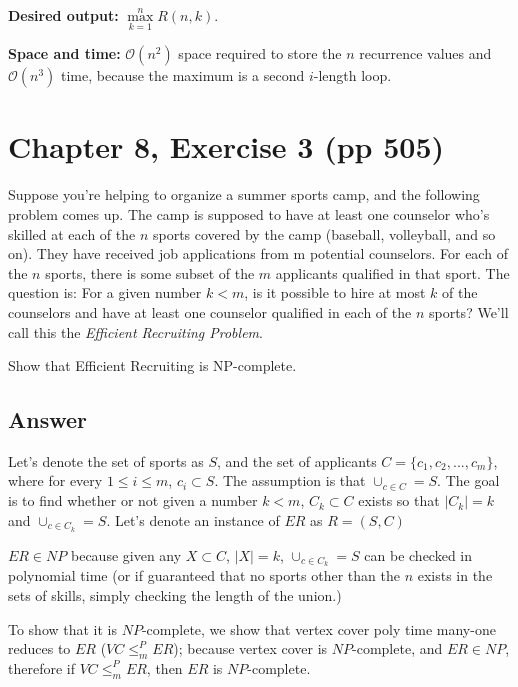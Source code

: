 \documentclass[12pt, letterpaper]{article}
\begin{document}
\vspace{5mm}
\noindent\textbf{Desired output:}
$\max\limits_{k=1}^{n} R(n, k)$.

\vspace{5mm}
\noindent\textbf{Space and time:}
$\mathcal{O}(n^2)$ space required to store the $n$ recurrence values and $\mathcal{O}(n^3)$ time, because the maximum is a second $i$-length loop.


\clearpage

\section{Chapter 8, Exercise 3 (pp 505)}
Suppose you're helping to organize a summer sports camp, and the following problem comes up. 
The camp is supposed to have at least one counselor who's skilled at each of the $n$ sports covered by the camp (baseball, volleyball, and so on). 
They have received job applications from m potential counselors. 
For each of the $n$ sports, there is some subset of the $m$ applicants qualified in that sport. 
The question is: For a given number $k < m$, is it possible to hire at most $k$ of the counselors and have at least one counselor qualified in each of the $n$ sports? 
We'll call this the \textit{Efficient Recruiting Problem}.

Show that Efficient Recruiting is NP-complete.

\vspace{-5mm}
\subsection*{Answer}
Let's denote the set of sports as $S$, and the set of applicants $C = \{ c_1, c_2, ..., c_m \}$, where for every $1 \leq i \leq m$, $c_i \subset S$.
The assumption is that $\cup_{c \in C} = S$.
The goal is to find whether or not given a number $k < m$, $C_k \subset C$ exists so that $|C_k| = k$ and $\cup_{c \in C_k} = S$.
Let's denote an instance of $ER$ as $R=(S, C)$

$ER \in NP$ because given any $X \subset C$, $|X| = k$, $\cup_{c \in C_k} = S$ can be checked in polynomial time (or if guaranteed that no sports other than the $n$ exists in the sets of skills, simply checking the length of the union.)

To show that it is $NP$-complete, we show that vertex cover poly time many-one reduces to $ER$ ($VC \leq_{m}^{P} ER$); because vertex cover is $NP$-complete, and $ER \in NP$, therefore if $VC \leq_{m}^{P} ER$, then $ER$ is $NP$-complete.
\end{document}
